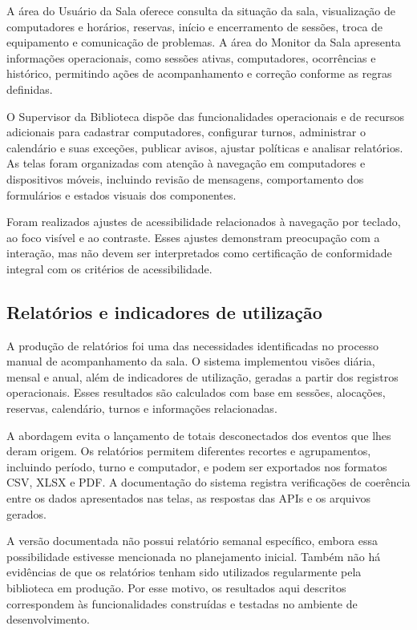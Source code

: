 A área do Usuário da Sala oferece consulta da situação da sala, visualização de computadores e horários, reservas, início e encerramento de sessões, troca de equipamento e comunicação de problemas. A área do Monitor da Sala apresenta informações operacionais, como sessões ativas, computadores, ocorrências e histórico, permitindo ações de acompanhamento e correção conforme as regras definidas.

O Supervisor da Biblioteca dispõe das funcionalidades operacionais e de recursos adicionais para cadastrar computadores, configurar turnos, administrar o calendário e suas exceções, publicar avisos, ajustar políticas e analisar relatórios. As telas foram organizadas com atenção à navegação em computadores e dispositivos móveis, incluindo revisão de mensagens, comportamento dos formulários e estados visuais dos componentes.

Foram realizados ajustes de acessibilidade relacionados à navegação por teclado, ao foco visível e ao contraste. Esses ajustes demonstram preocupação com a interação, mas não devem ser interpretados como certificação de conformidade integral com os critérios de acessibilidade.


\subsection{Relatórios e indicadores de utilização}

A produção de relatórios foi uma das necessidades identificadas no processo manual de acompanhamento da sala. O sistema implementou visões diária, mensal e anual, além de indicadores de utilização, geradas a partir dos registros operacionais. Esses resultados são calculados com base em sessões, alocações, reservas, calendário, turnos e informações relacionadas.

A abordagem evita o lançamento de totais desconectados dos eventos que lhes deram origem. Os relatórios permitem diferentes recortes e agrupamentos, incluindo período, turno e computador, e podem ser exportados nos formatos CSV, XLSX e PDF. A documentação do sistema registra verificações de coerência entre os dados apresentados nas telas, as respostas das APIs e os arquivos gerados.

A versão documentada não possui relatório semanal específico, embora essa possibilidade estivesse mencionada no planejamento inicial. Também não há evidências de que os relatórios tenham sido utilizados regularmente pela biblioteca em produção. Por esse motivo, os resultados aqui descritos correspondem às funcionalidades construídas e testadas no ambiente de desenvolvimento.

